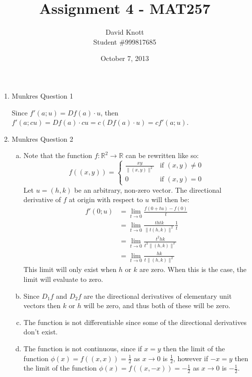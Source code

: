 \documentclass[letterpaper,10pt]{article}
\begin{document}
\title{Assignment 4 - MAT257}
\author{David Knott \\  Student \#999817685}
\date{October 7, 2013}
\maketitle
\begin{enumerate}
	\item Munkres Question 1

	Since $f'(a; u) = Df(a) \cdot u$, then $f'(a; cu) = Df(a) \cdot cu = c(Df(a) \cdot u) = cf'(a; u)$.

	\item Munkres Question 2
	\begin{enumerate}[a)]
		\item Note that the function $f:\mathbb{R}^2 \to \mathbb{R}$ can be rewritten like so:
		\[
		 f((x,y)) =
		  \begin{cases}
		   \frac{xy}{\|(x,y)\|^2} & \text{if } (x, y) \neq 0 \\
		   0       & \text{if } (x, y) = 0
		  \end{cases}
		\]
		Let $u = (h, k)$ be an arbitrary, non-zero vector. The directional derivative of $f$ at origin with respect to $u$ will then be:
		\begin{align*}
			f'(0; u) & = \lim_{t \to 0} \frac{f(0 + tu) - f(0)}{t} \\
			& =  \lim_{t \to 0} \frac{thtk}{\|t(h,k)\|^2}\frac{1}{t} \\
			& =  \lim_{t \to 0} \frac{t^2hk}{t^3\|(h,k)\|^2} \\
			& =  \lim_{t \to 0} \frac{hk}{t\|(h,k)\|^2}
		\end{align*}
		This limit will only exist when $h$ or $k$ are zero. When this is the case, the limit will evaluate to zero.
		\item Since $D_1 f$ and $D_2 f$ are the directional derivatives of elementary unit vectors then $k$ or $h$ will be zero, and thus both of these will be zero.
		\item The function is not differentiable since some of the directional derivatives don't exist.
		\item The function is not continuous, since if $x = y$ then the limit of the function $\phi(x) = f((x,x)) = \frac{1}{2}$ as $x \to 0$ is $\frac{1}{2}$, however if $-x = y$ then the limit of the function $\phi(x) = f((x,-x)) = -\frac{1}{2}$ as $x \to 0$ is $-\frac{1}{2}$.
	\end{enumerate}


\end{enumerate}
\end{document}
